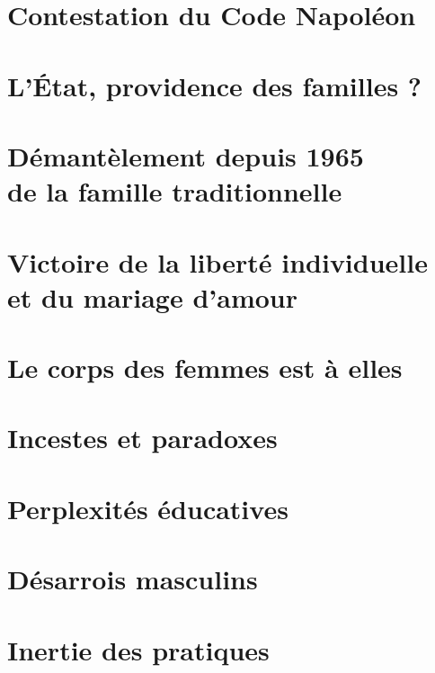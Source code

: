 \documentclass[12pt,french]{book}
\begin{document}
\chapter{Contestation du Code Napoléon}


\chapter{L'État, providence des familles ?}


\chapter[Démantèlement depuis 1965 de la famille traditionnelle]{Démantèlement depuis 1965\\de la famille traditionnelle}


\chapter[Victoire de la liberté individuelle et du mariage d'amour]{Victoire de la liberté individuelle\\et du mariage d'amour}


\chapter{Le corps des femmes est à elles}


\chapter{Incestes et paradoxes}


\chapter{Perplexités éducatives}


\chapter{Désarrois masculins}


\chapter{Inertie des pratiques}

\end{document}
